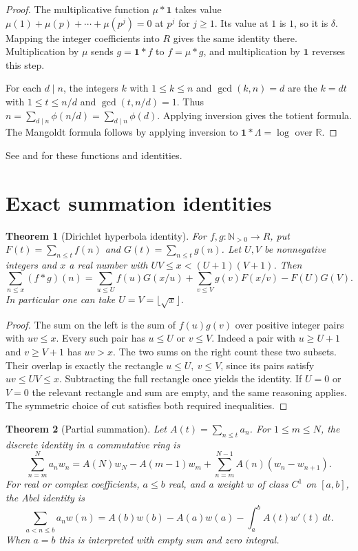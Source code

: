 \documentclass[11pt,oneside,openany]{book}
\theoremstyle{plain}
\newtheorem{theorem}{Theorem}[chapter]
\theoremstyle{definition}
\theoremstyle{remark}
\begin{document}
\begin{proof}
The multiplicative function \(\mu*\mathbf{1}\) takes value
\(\mu(1)+\mu(p)+\cdots+\mu(p^j)=0\) at \(p^j\) for \(j\ge1\).
Its value at \(1\) is \(1\), so it is \(\delta\). Mapping the integer
coefficients into \(R\) gives the same identity there. Multiplication by
\(\mu\) sends \(g=\mathbf{1}*f\) to \(f=\mu*g\), and multiplication by
\(\mathbf{1}\) reverses this step.

For each \(d\mid n\), the integers \(k\) with \(1\le k\le n\) and
\(\gcd(k,n)=d\) are the \(k=dt\) with \(1\le t\le n/d\) and
\(\gcd(t,n/d)=1\). Thus \(n=\sum_{d\mid n}\phi(n/d)
=\sum_{d\mid n}\phi(d)\). Applying inversion gives the totient formula.
The Mangoldt formula follows by applying inversion to
\(\mathbf{1}*\Lambda=\log\) over \(\mathbb R\).
\end{proof}

See \cite[Sections 2.2--2.8 and 2.13]{apostol} and
\cite[Sections 4.2--4.3]{nzm} for these functions and identities.

\section{Exact summation identities}

\begin{theorem}[Dirichlet hyperbola identity]\label{nt:C05}
For \(f,g\colon\mathbb N_{>0}\to R\), put \(F(t)=\sum_{n\le t}f(n)\)
and \(G(t)=\sum_{n\le t}g(n)\). Let \(U,V\) be nonnegative integers and
\(x\) a real number with \(UV\le x<(U+1)(V+1)\). Then
\[
 \sum_{n\le x}(f*g)(n)=
 \sum_{u\le U}f(u)G(x/u)+\sum_{v\le V}g(v)F(x/v)-F(U)G(V).
\]
In particular one can take \(U=V=\lfloor\sqrt{x}\rfloor\).
\end{theorem}

\begin{proof}
The sum on the left is the sum of \(f(u)g(v)\) over positive integer
pairs with \(uv\le x\). Every such pair has \(u\le U\) or \(v\le V\).
Indeed a pair with \(u\ge U+1\) and \(v\ge V+1\) has \(uv>x\).
The two sums on the right count these two subsets. Their overlap is
exactly the rectangle \(u\le U,\ v\le V\), since its pairs satisfy
\(uv\le UV\le x\). Subtracting the full rectangle once yields the
identity. If \(U=0\) or \(V=0\) the relevant rectangle and sum are empty,
and the same reasoning applies. The symmetric choice of cut satisfies
both required inequalities.
\end{proof}

\begin{theorem}[Partial summation]\label{nt:C06}
Let \(A(t)=\sum_{n\le t}a_n\). For \(1\le m\le N\), the discrete
identity in a commutative ring is
\[
 \sum_{n=m}^{N} a_n w_n
 =A(N)w_N-A(m-1)w_m+\sum_{n=m}^{N-1} A(n)(w_n-w_{n+1}).
\]
For real or complex coefficients, \(a\le b\) real, and a weight
\(w\) of class \(C^1\) on \([a,b]\), the Abel identity is
\[
 \sum_{a<n\le b} a_nw(n)
 =A(b)w(b)-A(a)w(a)-\int_a^b A(t)w'(t)\,dt .
\]
When \(a=b\) this is interpreted with empty sum and zero integral.
\end{theorem}
\end{document}
